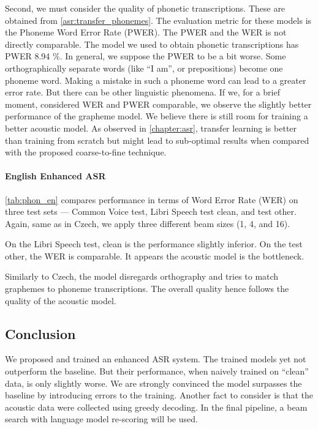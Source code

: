 Second, we must consider the quality of phonetic transcriptions. These are obtained from \cref{asr:transfer_phonemes}. The evaluation metric for these models is the Phoneme Word Error Rate (PWER). The PWER and the WER is not directly comparable. The model we used to obtain phonetic transcriptions has PWER 8.94 \%. In general, we suppose the PWER to be a bit worse. Some orthographically separate words (like ``I am'', or prepositions) become one phoneme word. Making a mistake in such a phoneme word can lead to a greater error rate. But there can be other linguistic phenomena. If we, for a brief moment, considered WER and PWER comparable, we observe the slightly better performance of the grapheme model. We believe there is still room for training a better acoustic model. As observed in \cref{chapter:asr}, transfer learning is better than training from scratch but might lead to sub-optimal results when compared with the proposed coarse-to-fine technique. 

\paragraph{English Enhanced ASR}
\cref{tab:phon_en} compares performance in terms of Word Error Rate (WER) on three test sets --- Common Voice test, Libri Speech test clean, and test other. Again, same as in Czech, we apply three different beam sizes (1, 4, and 16).

On the Libri Speech test, clean is the performance slightly inferior. On the test other, the WER is comparable. It appears the acoustic model is the bottleneck. 

Similarly to Czech, the model disregards orthography and tries to match graphemes to phoneme transcriptions. The overall quality hence follows the quality of the acoustic model.

\subsection{Conclusion}
We proposed and trained an enhanced ASR system. The trained models yet not outperform the baseline. But their performance, when naively trained on ``clean'' data, is only slightly worse. We are strongly convinced the model surpasses the baseline by introducing errors to the training. Another fact to consider is that the acoustic data were collected using greedy decoding. In the final pipeline, a beam search with language model re-scoring will be used. 
